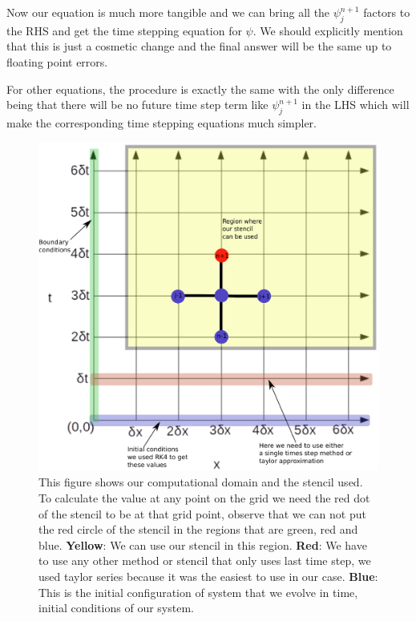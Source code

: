 Now our equation is much more tangible and we can bring all the $\psi^{n+1}_j$ factors to the RHS and get the time stepping equation for $\psi$. We should explicitly mention that this is just a cosmetic change and the final answer will be the same up to floating point errors.

For other equations, the procedure is exactly the same with the only difference being that there will be no future time step term like $\psi^{n+1}_j$ in the LHS which will make the corresponding time stepping equations much simpler.


\begin{figure}[hbt!]
    \centering
    \includegraphics[width=\textwidth]{images/labelled_grid.eps}
    \caption{This figure shows our computational domain and the stencil used. To calculate the value at any point on the grid we need the red dot of the stencil to be at that grid point, observe that we can not put the red circle of the stencil in the regions that are green, red and blue. \textbf{Yellow}: We can use our stencil in this region. \textbf{Red}: We have to use any other method or stencil that only uses last time step, we used taylor series because it was the easiest to use in our case. \textbf{Blue}: This is the initial configuration of system that we evolve in time, initial conditions of our system.}
    \label{fig:grid_with_stencil_and_regions}
\end{figure}



